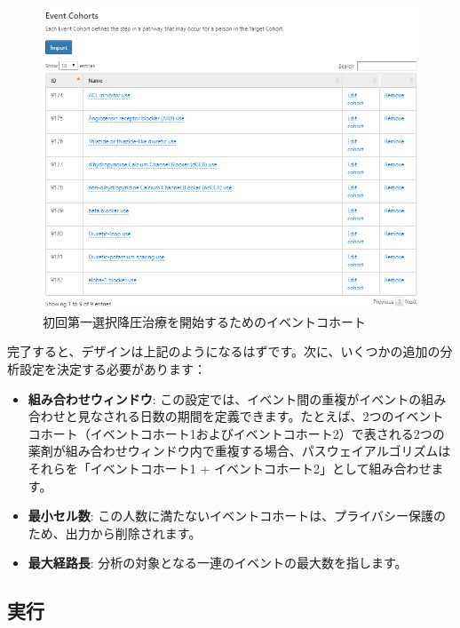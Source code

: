 \documentclass[
  11pt]{book}
\providecommand{\tightlist}{%
  \setlength{\itemsep}{0pt}\setlength{\parskip}{0pt}}
\theoremstyle{definition}
\theoremstyle{definition}
\theoremstyle{definition}
\theoremstyle{definition}
\theoremstyle{remark}
\begin{document}
\begin{figure}

{\centering \includegraphics[width=1\linewidth]{images/Characterization/atlasPathwaysEventCohorts} 

}

\caption{初回第一選択降圧治療を開始するためのイベントコホート}\label{fig:atlasPathwaysEventCohorts}
\end{figure}

完了すると、デザインは上記のようになるはずです。次に、いくつかの追加の分析設定を決定する必要があります：

\begin{itemize}
\tightlist
\item
  \textbf{組み合わせウィンドウ}: この設定では、イベント間の重複がイベントの組み合わせと見なされる日数の期間を定義できます。たとえば、2つのイベントコホート（イベントコホート1およびイベントコホート2）で表される2つの薬剤が組み合わせウィンドウ内で重複する場合、パスウェイアルゴリズムはそれらを「イベントコホート1 + イベントコホート2」として組み合わせます。
\item
  \textbf{最小セル数}: この人数に満たないイベントコホートは、プライバシー保護のため、出力から削除されます。
\item
  \textbf{最大経路長}: 分析の対象となる一連のイベントの最大数を指します。
\end{itemize}

\subsection{実行}\label{ux5b9fux884c-1}
\end{document}
